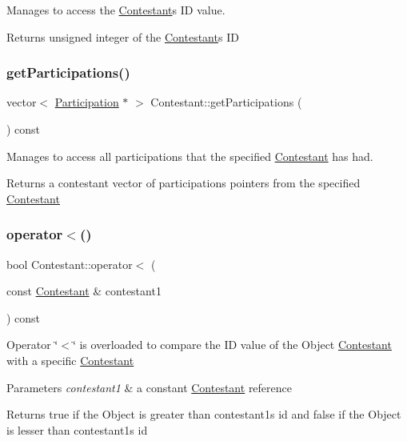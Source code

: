 Manages to access the \hyperlink{class_contestant}{Contestant}\textquotesingle{}s ID value. 

\begin{DoxyReturn}{Returns}
unsigned integer of the \hyperlink{class_contestant}{Contestant}\textquotesingle{}s ID 
\end{DoxyReturn}
\mbox{\label{class_contestant_abd0caa85a134d63212cf9e0f9ccc7a1d}} 
\subsubsection{\texorpdfstring{get\+Participations()}{getParticipations()}}
{\footnotesize\ttfamily vector$<$ \hyperlink{struct_participation}{Participation} $\ast$ $>$ Contestant\+::get\+Participations (\begin{DoxyParamCaption}{ }\end{DoxyParamCaption}) const}



Manages to access all participations that the specified \hyperlink{class_contestant}{Contestant} has had. 

\begin{DoxyReturn}{Returns}
a contestant vector of participations pointers from the specified \hyperlink{class_contestant}{Contestant} 
\end{DoxyReturn}
\mbox{\label{class_contestant_ae51d0d7eb8a0cf2e70f0cfe92c74e7ae}} 
\subsubsection{\texorpdfstring{operator$<$()}{operator<()}}
{\footnotesize\ttfamily bool Contestant\+::operator$<$ (\begin{DoxyParamCaption}\item[{const \hyperlink{class_contestant}{Contestant} \&}]{contestant1 }\end{DoxyParamCaption}) const}

Operator \char`\"{}$<$\char`\"{} is overloaded to compare the ID value of the Object \hyperlink{class_contestant}{Contestant} with a specific \hyperlink{class_contestant}{Contestant} 
\begin{DoxyParams}{Parameters}
{\em contestant1} & a constant \hyperlink{class_contestant}{Contestant} reference \\
\hline
\end{DoxyParams}
\begin{DoxyReturn}{Returns}
true if the Object is greater than contestant1\textquotesingle{}s id and false if the Object is lesser than contestant1\textquotesingle{}s id 
\end{DoxyReturn}
\mbox{\label{class_contestant_a6d1d627ddf49dc5d3b77a6d42a3680fd}} 
